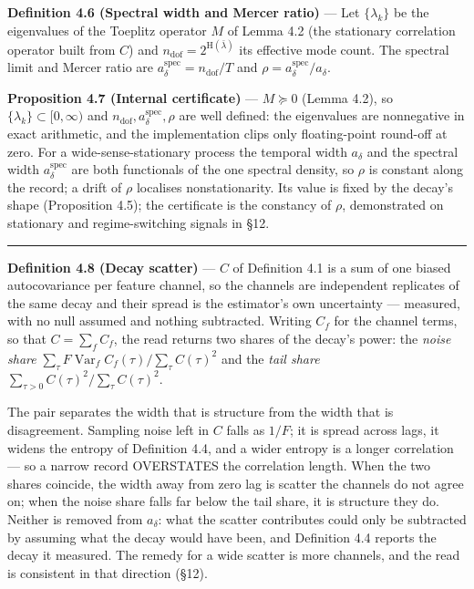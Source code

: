 \documentclass[10pt,letterpaper,twocolumn]{article}
\begin{document}
\textbf{Definition 4.6 (Spectral width and Mercer ratio)} --- Let \(\{\lambda_k\}\) be the eigenvalues of the Toeplitz operator \(M\) of Lemma 4.2 (the stationary correlation operator built from \(C\)) and \(n_{\mathrm{dof}}=2^{\mathrm{H}(\bar\lambda)}\) its effective mode count. The spectral limit and Mercer ratio are \(a_\delta^{\mathrm{spec}}=n_{\mathrm{dof}}/T\) and \(\rho=a_\delta^{\mathrm{spec}}/a_\delta\).

\textbf{Proposition 4.7 (Internal certificate)} --- \(M\succeq0\) (Lemma 4.2), so \(\{\lambda_k\}\subset[0,\infty)\) and \(n_{\mathrm{dof}},a_\delta^{\mathrm{spec}},\rho\) are well defined: the eigenvalues are nonnegative in exact arithmetic, and the implementation clips only floating-point round-off at zero. For a wide-sense-stationary process the temporal width \(a_\delta\) and the spectral width \(a_\delta^{\mathrm{spec}}\) are both functionals of the one spectral density, so \(\rho\) is constant along the record; a drift of \(\rho\) localises nonstationarity. Its value is fixed by the decay's shape (Proposition 4.5); the certificate is the constancy of \(\rho\), demonstrated on stationary and regime-switching signals in §12.

\begin{center}\rule{0.5\linewidth}{0.5pt}\end{center}

\textbf{Definition 4.8 (Decay scatter)} --- \(C\) of Definition 4.1 is a sum of one biased autocovariance per feature channel, so the channels are independent replicates of the same decay and their spread is the estimator's own uncertainty --- measured, with no null assumed and nothing subtracted. Writing \(C_f\) for the channel terms, so that \(C=\sum_f C_f\), the read returns two shares of the decay's power: the \emph{noise share} \(\sum_\tau F\operatorname{Var}_f C_f(\tau)\big/\sum_\tau C(\tau)^2\) and the \emph{tail share} \(\sum_{\tau>0}C(\tau)^2\big/\sum_\tau C(\tau)^2\).

The pair separates the width that is structure from the width that is disagreement. Sampling noise left in \(C\) falls as \(1/F\); it is spread across lags, it widens the entropy of Definition 4.4, and a wider entropy is a longer correlation --- so a narrow record OVERSTATES the correlation length. When the two shares coincide, the width away from zero lag is scatter the channels do not agree on; when the noise share falls far below the tail share, it is structure they do. Neither is removed from \(a_\delta\): what the scatter contributes could only be subtracted by assuming what the decay would have been, and Definition 4.4 reports the decay it measured. The remedy for a wide scatter is more channels, and the read is consistent in that direction (§12).
\end{document}
